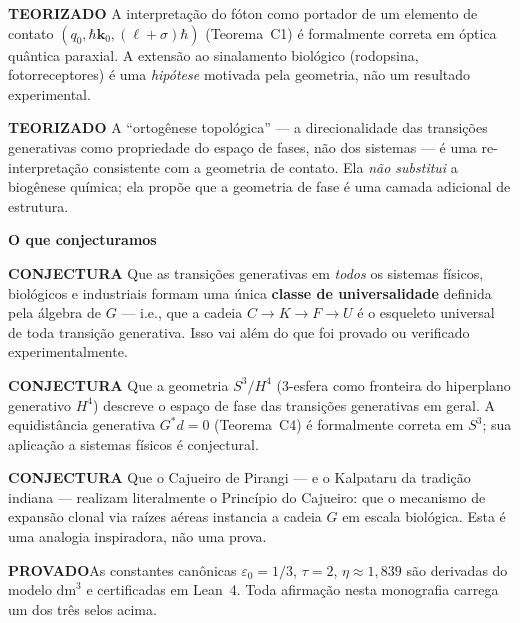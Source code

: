 \documentclass[12pt,a4paper,twoside]{book}
\theoremstyle{plain}
\theoremstyle{definition}
\newcommand{\provadostamp}{\noindent\colorbox{cajunavy!10}{\color{cajunavy}\bfseries\small PROVADO}\quad}
\newcommand{\teorizadostamp}{\noindent\colorbox{cajugold!20}{\color{cajugold!60!black}\bfseries\small TEORIZADO}\quad}
\newcommand{\conjecturastamp}{\noindent\colorbox{cajured!10}{\color{cajured}\bfseries\small CONJECTURA}\quad}
\theoremstyle{definition}
\newcommand{\epsz}{\varepsilon_{0}}
\newcommand{\tribo}{\eta}
\newcommand{\dm}{\mathrm{dm}^{3}}
\begin{document}
\teorizadostamp
A interpretação do fóton como portador de um elemento de contato
$(q_0, \hbar\mathbf{k}_0, (\ell+\sigma)\hbar)$ (Teorema~C1) é
formalmente correta em óptica quântica paraxial. A extensão ao
sinalamento biológico (rodopsina, fotorreceptores) é uma
\emph{hipótese} motivada pela geometria, não um resultado
experimental.

\teorizadostamp
A ``ortogênese topológica'' --- a direcionalidade das transições
generativas como propriedade do espaço de fases, não dos sistemas
--- é uma re-interpretação consistente com a geometria de contato.
Ela \emph{não substitui} a biogênese química; ela propõe que
a geometria de fase é uma camada adicional de estrutura.

\bigskip
\noindent\textbf{\large O que conjecturamos}

\smallskip
\conjecturastamp
Que as transições generativas em \emph{todos} os sistemas físicos,
biológicos e industriais formam uma única \textbf{classe de universalidade}
definida pela álgebra de $G$ --- i.e., que a cadeia $C \to K \to F \to U$
é o esqueleto universal de toda transição generativa. Isso vai além do
que foi provado ou verificado experimentalmente.

\conjecturastamp
Que a geometria $S^{3}/H^{4}$ (3-esfera como fronteira do hiperplano
generativo $H^4$) descreve o espaço de fase das transições generativas
em geral. A equidistância generativa $G^{*}d = 0$ (Teorema~C4) é
formalmente correta em $S^3$; sua aplicação a sistemas físicos é
conjectural.

\conjecturastamp
Que o Cajueiro de Pirangi --- e o Kalpataru da tradição indiana ---
realizam literalmente o Princípio do Cajueiro: que o mecanismo de
expansão clonal via raízes aéreas instancia a cadeia $G$ em escala
biológica. Esta é uma analogia inspiradora, não uma prova.

\bigskip
\noindent \provadostamp As constantes canônicas $\epsz = 1/3$, $\tau = 2$,
$\tribo \approx 1{,}839$ são derivadas do modelo $\dm$ e certificadas em Lean~4.
Toda afirmação nesta monografia carrega um dos três selos acima.
\end{document}

